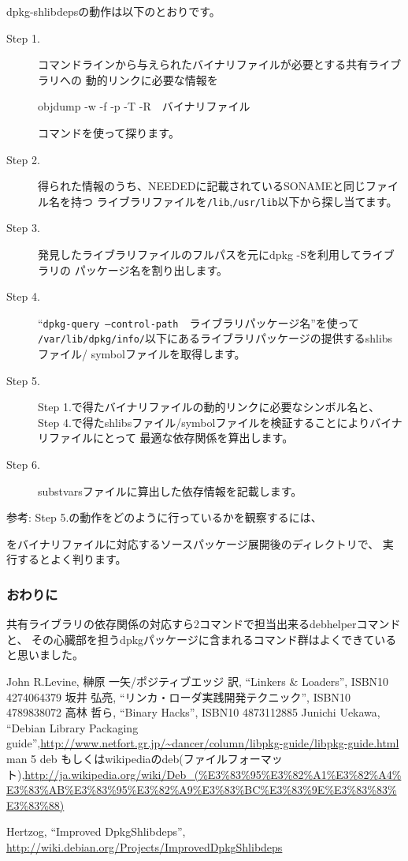 \documentclass[mingoth,a4paper]{jsarticle}
\begin{document}
 dpkg-shlibdepsの動作は以下のとおりです。
\begin{description}
\item [Step 1.] コマンドラインから与えられたバイナリファイルが必要とする共有ライブラリへの
動的リンクに必要な情報を
\begin{commandline}
objdump -w -f -p -T -R　バイナリファイル
\end{commandline}
コマンドを使って探ります。
\item [Step 2.] 得られた情報のうち、NEEDEDに記載されているSONAMEと同じファイル名を持つ
ライブラリファイルを\texttt{/lib},\texttt{/usr/lib}以下から探し当てます。
\item [Step 3.] 発見したライブラリファイルのフルパスを元にdpkg -Sを利用してライブラリの
パッケージ名を割り出します。
\item [Step 4.] ``\texttt{dpkg-query --control-path}　ライブラリパッケージ名''を使って
\texttt{/var/lib/dpkg/info/}以下にあるライブラリパッケージの提供するshlibsファイル/
symbolファイルを取得します。
\item [Step 5.] Step 1.で得たバイナリファイルの動的リンクに必要なシンボル名と、
Step 4.で得たshlibsファイル/symbolファイルを検証することによりバイナリファイルにとって
最適な依存関係を算出します。
\item [Step 6.] substvarsファイルに算出した依存情報を記載します。
\end{description}

 参考: Step 5.の動作をどのように行っているかを観察するには、
をバイナリファイルに対応するソースパッケージ展開後のディレクトリで、
実行するとよく判ります。

\subsubsection{おわりに}

 共有ライブラリの依存関係の対応すら2コマンドで担当出来るdebhelperコマンドと、
その心臓部を担うdpkgパッケージに含まれるコマンド群はよくできていると思いました。

\begin{thebibliography}{98}
 John R.Levine, 榊原 一矢/ポジティブエッジ 訳, ``Linkers \&
	 Loaders'', ISBN10 4274064379
 坂井 弘亮,  ``リンカ・ローダ実践開発テクニック'', ISBN10 4789838072
 高林 哲ら, ``Binary Hacks'', ISBN10 4873112885
 Junichi Uekawa, ``Debian Library Packaging guide'',\url{http://www.netfort.gr.jp/~dancer/column/libpkg-guide/libpkg-guide.html}
 man 5 deb もしくはwikipediaのdeb(ファイルフォーマット),\url{http://ja.wikipedia.org/wiki/Deb_(%E3%83%95%E3%82%A1%E3%82%A4%E3%83%AB%E3%83%95%E3%82%A9%E3%83%BC%E3%83%9E%E3%83%83%E3%83%88)}

Hertzog, ``Improved DpkgShlibdeps'', \url{http://wiki.debian.org/Projects/ImprovedDpkgShlibdeps}

\end{thebibliography}
\end{document}
